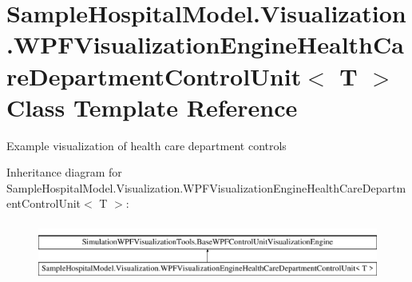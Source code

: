 \hypertarget{class_sample_hospital_model_1_1_visualization_1_1_w_p_f_visualization_engine_health_care_department_control_unit}{}\section{Sample\+Hospital\+Model.\+Visualization.\+W\+P\+F\+Visualization\+Engine\+Health\+Care\+Department\+Control\+Unit$<$ T $>$ Class Template Reference}
\label{class_sample_hospital_model_1_1_visualization_1_1_w_p_f_visualization_engine_health_care_department_control_unit}


Example visualization of health care department controls  


Inheritance diagram for Sample\+Hospital\+Model.\+Visualization.\+W\+P\+F\+Visualization\+Engine\+Health\+Care\+Department\+Control\+Unit$<$ T $>$\+:\begin{figure}[H]
\begin{center}
\leavevmode
\includegraphics[height=1.937716cm]{class_sample_hospital_model_1_1_visualization_1_1_w_p_f_visualization_engine_health_care_department_control_unit}
\end{center}
\end{figure}
